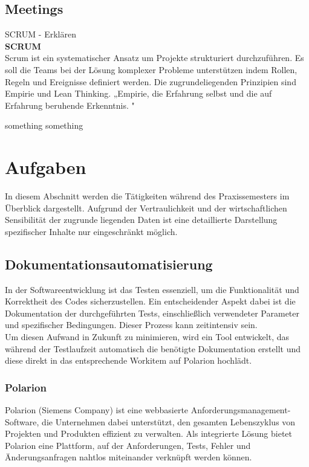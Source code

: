 \documentclass[a4paper, 12pt]{article}
\begin{document}
\subsection{Meetings}\label{Meetings}
SCRUM - Erklären
\\ 
\textbf{SCRUM}\\
Scrum ist ein systematischer Ansatz um Projekte strukturiert durchzuführen. Es soll die Teams bei der Lösung komplexer Probleme unterstützen indem Rollen, Regeln und Ereignisse definiert werden. Die zugrundeliegenden Prinzipien sind Empirie und Lean Thinking. 
„Empirie, die Erfahrung selbst und die auf Erfahrung beruhende Erkenntnis.  
 \cite{dorsch_empirie}" 

something something  %
\cite{scrum2020}

\newpage
\section{Aufgaben}\label{Aufgaben}
In diesem Abschnitt werden die Tätigkeiten während des Praxissemesters im Überblick dargestellt. Aufgrund der Vertraulichkeit und der wirtschaftlichen Sensibilität der zugrunde liegenden Daten ist eine detaillierte Darstellung spezifischer Inhalte nur eingeschränkt möglich.

\subsection{Dokumentationsautomatisierung}\label{Dokumentationsautomatisierung}
In der Softwareentwicklung ist das Testen essenziell, um die Funktionalität und Korrektheit des Codes sicherzustellen. Ein entscheidender Aspekt dabei ist die Dokumentation der durchgeführten Tests, einschließlich verwendeter Parameter und spezifischer Bedingungen. Dieser Prozess kann zeitintensiv sein. \\
Um diesen Aufwand in Zukunft zu minimieren, wird ein Tool entwickelt, das während der Testlaufzeit automatisch die benötigte Dokumentation erstellt und diese direkt in das entsprechende Workitem auf Polarion hochlädt.

\subsubsection{Polarion}\label{polarion}
Polarion (Siemens Company) ist eine webbasierte Anforderungsmanagement-Software, die Unternehmen dabei unterstützt, den gesamten Lebenszyklus von Projekten und Produkten effizient zu verwalten. Als integrierte Lösung bietet Polarion eine Plattform, auf der Anforderungen, Tests, Fehler und Änderungsanfragen nahtlos miteinander verknüpft werden können.
\end{document}
